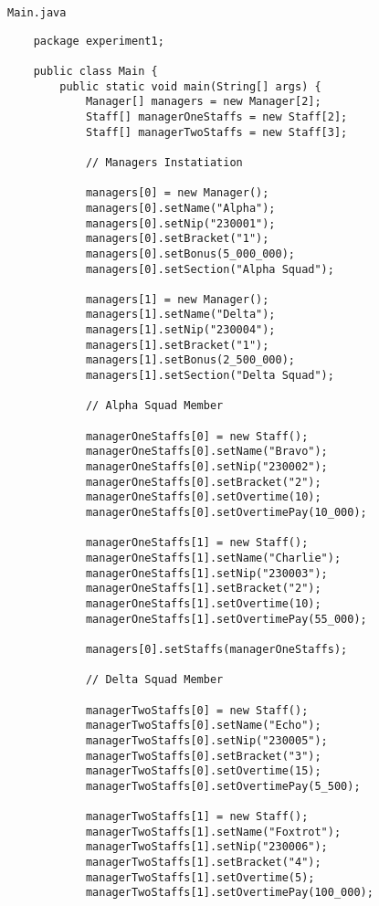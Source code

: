 \documentclass[12pt,titlepage]{article}
\begin{document}
\texttt{Main.java}
\begin{verbatim}
    package experiment1;

    public class Main {
        public static void main(String[] args) {
            Manager[] managers = new Manager[2];
            Staff[] managerOneStaffs = new Staff[2];
            Staff[] managerTwoStaffs = new Staff[3];

            // Managers Instatiation

            managers[0] = new Manager();
            managers[0].setName("Alpha");
            managers[0].setNip("230001");
            managers[0].setBracket("1");
            managers[0].setBonus(5_000_000);
            managers[0].setSection("Alpha Squad");

            managers[1] = new Manager();
            managers[1].setName("Delta");
            managers[1].setNip("230004");
            managers[1].setBracket("1");
            managers[1].setBonus(2_500_000);
            managers[1].setSection("Delta Squad");

            // Alpha Squad Member

            managerOneStaffs[0] = new Staff();
            managerOneStaffs[0].setName("Bravo");
            managerOneStaffs[0].setNip("230002");
            managerOneStaffs[0].setBracket("2");
            managerOneStaffs[0].setOvertime(10);
            managerOneStaffs[0].setOvertimePay(10_000);

            managerOneStaffs[1] = new Staff();
            managerOneStaffs[1].setName("Charlie");
            managerOneStaffs[1].setNip("230003");
            managerOneStaffs[1].setBracket("2");
            managerOneStaffs[1].setOvertime(10);
            managerOneStaffs[1].setOvertimePay(55_000);
            
            managers[0].setStaffs(managerOneStaffs);
            
            // Delta Squad Member
            
            managerTwoStaffs[0] = new Staff();
            managerTwoStaffs[0].setName("Echo");
            managerTwoStaffs[0].setNip("230005");
            managerTwoStaffs[0].setBracket("3");
            managerTwoStaffs[0].setOvertime(15);
            managerTwoStaffs[0].setOvertimePay(5_500);

            managerTwoStaffs[1] = new Staff();
            managerTwoStaffs[1].setName("Foxtrot");
            managerTwoStaffs[1].setNip("230006");
            managerTwoStaffs[1].setBracket("4");
            managerTwoStaffs[1].setOvertime(5);
            managerTwoStaffs[1].setOvertimePay(100_000);


\end{verbatim}
\end{document}

